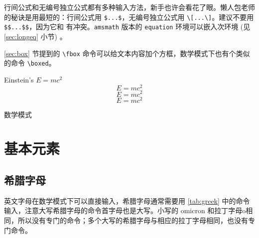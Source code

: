 行间公式和无编号独立公式都有多种输入方法，新手也许会看花了眼。懒人包老师的秘诀是用最短的：行间公式用 \verb|$...$|，无编号独立公式用 \verb|\[...\]|。建议不要用 \verb|$$...$$|，因为它和 \AmSLaTeX 有冲突。\texttt{ams\-math} 版本的 \texttt{equation} 环境可以嵌入次环境 (见 \ref{sec:longeq} 小节) 。

\ref{sec:box} 节提到的 \verb|\fbox| 命令可以给文本内容加个方框，数学模式下也有个类似的命令 \verb|\boxed|。

\begin{example}[h]
\begin{RLDemo}[numbers=left]
Einstein's $E=mc^2$
\[ E=mc^2 \]
\[ \boxed{E=mc^2} \]
\begin{equation} 
  E=mc^2 
\end{equation}
\end{RLDemo}
\caption{数学模式}
\end{example}

\section{基本元素}

\subsection{希腊字母}

英文字母在数学模式下可以直接输入，希腊字母通常需要用 \autoref{tab:greek} 中的命令输入，注意大写希腊字母的命令首字母也是大写。小写的 omicron 和拉丁字母o相同，所以没有专门的命令；多个大写的希腊字母与相应的拉丁字母相同，也没有专门命令。

